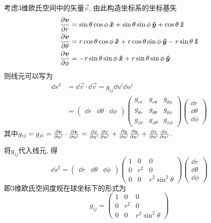 \begin{solution}
    考虑$3$维欧氏空间中的矢量$\vec{v}$, 由此构造坐标系的坐标基矢
    \[
        \begin{aligned}
            \frac{\partial \boldsymbol{v}}{\partial r} &= \sin\theta \cos\phi \,\boldsymbol{\hat{x}} + \sin\theta \sin\phi \,\boldsymbol{\hat{y}} + \cos\theta \,\boldsymbol{\hat{z}} \\
            \frac{\partial \boldsymbol{v}}{\partial \theta} &= r \cos\theta \cos\phi \,\boldsymbol{\hat{x}} + r \cos\theta \sin\phi \,\boldsymbol{\hat{y}} - r \sin\theta \,\boldsymbol{\hat{z}} \\
            \frac{\partial \boldsymbol{v}}{\partial \phi} &= -r \sin\theta \sin\phi \,\boldsymbol{\hat{x}} + r \sin\theta \sin\phi \,\boldsymbol{\hat{y}}
        \end{aligned}
    \]
    则线元可以写为
    \[
    \begin{aligned}
        \dd s^2 &= \dd \vec{v} \cdot \dd \vec{v} = g_{ij} \dd u^i \dd u^j\\
        &= \begin{pmatrix}
            \dd r & \dd \theta & \dd \phi
        \end{pmatrix} \begin{pmatrix}
            g_{rr} & g_{r\theta} & g_{\theta\phi} \\
            g_{\theta r} & g_{\theta\theta} & g_{\theta\phi} \\
            g_{\phi r} & g_{\phi\theta} & g_{\phi\phi}
        \end{pmatrix} \begin{pmatrix}
            \dd r \\ \dd \theta \\ \dd \phi
        \end{pmatrix}
    \end{aligned}
    \]
    其中$g_{ij} = g_{ji} = \frac{\partial \boldsymbol{v}}{\partial u^i} \cdot \frac{\partial \boldsymbol{v}}{\partial u^j} =
    \frac{\partial x}{\partial u^i} \frac{\partial x}{\partial u^j} + \frac{\partial y}{\partial u^i}
    \frac{\partial y}{\partial u^j} + \frac{\partial z}{\partial u^i} \frac{\partial z}{\partial u^j}$.
    
    将$g_{ij}$代入线元, 得
    \[
        \dd s^2 = \begin{pmatrix}
            \dd r & \dd \theta & \dd \phi
        \end{pmatrix} \begin{pmatrix}
            1 & 0 & 0 \\
            0 & r^2 & 0 \\
            0 & 0 & r^2 \sin^2\theta
        \end{pmatrix} \begin{pmatrix}
            \dd r \\ \dd \theta \\ \dd \phi
        \end{pmatrix}
    \]
    即$3$维欧氏空间度规在球坐标下的形式为
    \[
        g_{ij} = \begin{pmatrix}
            1 & 0 & 0 \\
            0 & r^2 & 0 \\
            0 & 0 & r^2 \sin^2\theta
        \end{pmatrix}
    \]
\end{solution}
